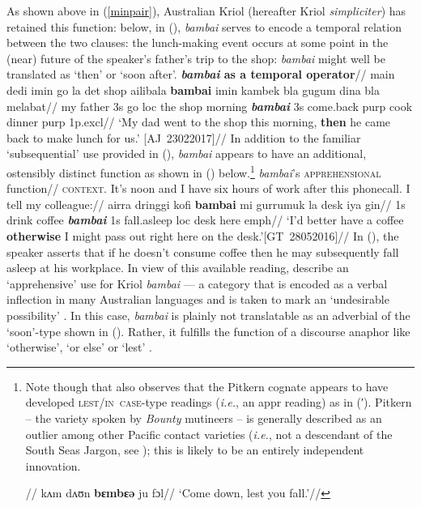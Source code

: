 As shown above in (\ref{minpair}), Australian Kriol (hereafter Kriol \textit{simpliciter}) has retained this function: below, in (), \textit{bambai} serves to encode a temporal relation between the two clauses: the lunch-making event occurs at some point in the (near) future of the speaker's father's trip to the shop: \textit{bambai }might well be translated as `then' or `soon after'.
\pex{}\begingl\glpreamble \textbf{\textit{bambai} as a temporal operator}//
\gla main dedi imin go la det shop ailibala \textbf{bambai} imin kambek bla gugum dina bla melabat//
\glb my father 3s go {\sc loc} the shop morning \textit{\textbf{bambai}} 3s come.back {\sc purp} cook dinner {\sc purp} 1p{\sc.excl}//
\glft`My dad went to the shop this morning, \textbf{then} he came back to make lunch for us.' \hspace*{\fill}[AJ~23022017]//
\endgl\xe
In addition to the familiar `subsequential' use provided in (), \textit{bambai} appears to have an additional, ostensibly distinct function as shown in () below.\footnote{
	Note though that \citeauthor{Clark1979} also observes that the Pitkern cognate appears to have developed \textsc{lest/in~case}-type readings (\textit{i.e.}, an \gls{appr} reading) as in (′). Pitkern -- the variety spoken by \textit{Bounty} mutineers -- is generally described as an outlier among other Pacific contact varieties (\textit{i.e.}, not a descendant of the South Seas Jargon, see \citealp[48]{Clark1979}); this is likely to be an entirely independent innovation.\label{PN footnote}

\pex[aboveglftskip=0ex,exno=\getref{app0}′]\begingl\glpreamble{}//
\gla kʌm dʌʊn \textbf{bɛmbɛǝ} ju  fɔl//
\glft`Come down, lest you fall.'//\endgl
\xe

}
\pex
\begingl\glpreamble \textit{bambai}'s \textsc{apprehensional} function//
\glpreamble\textsc{context.}  It's noon and I have six hours of work after this phonecall. I tell my colleague://
\gla ai\textdblhyphen{}rra dringgi kofi \textbf{bambai} mi gurrumuk la desk iya gin//
\glb 1s drink coffee \textit{\textbf{bambai}} 1s fall.asleep {\sc loc} desk here {\sc emph}//
\glft `I'd better have a coffee \textbf{otherwise} I might pass out right here on the desk.'\hfill[GT~28052016]//
\endgl
\xe
In (), the speaker asserts that if he doesn't consume coffee then he may subsequently fall asleep at his workplace. In view of this available reading, \citeauthor{Angelo2016} describe an `apprehensive' use for Kriol \textit{bambai} --- a category that is encoded as a verbal inflection in many Australian languages and is taken to mark an `undesirable possibility' \citeyearpar[256]{Angelo2016}. In this case, \textit{bambai} is plainly not translatable as an adverbial of the `soon'-type shown in (). Rather, it fulfills the function of a discourse anaphor like `otherwise', `or else' or `lest' \citep[see also][]{Webber2001,PhilKotek}.

